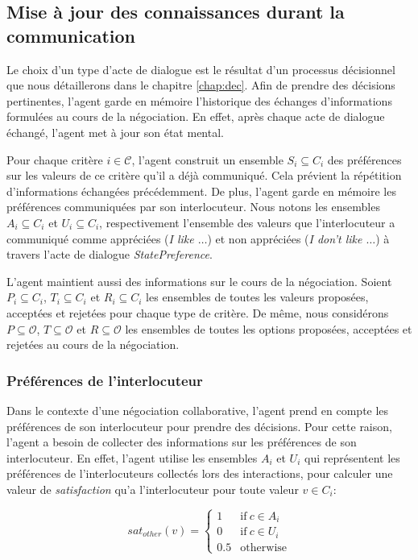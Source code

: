 			\subsection{Mise à jour des connaissances durant la communication}
			
			Le choix d'un type d'acte de dialogue est le résultat d'un processus décisionnel que nous détaillerons dans le chapitre \ref{chap:dec}. 
			Afin de prendre des décisions pertinentes, l'agent garde en mémoire l'historique des échanges d'informations formulées au cours de la négociation.  En effet, après chaque acte de dialogue échangé, l'agent met à jour son état mental.  
			
			
			Pour chaque critère $i\in\mathcal{C}$, l'agent construit un ensemble $S_i \subseteq C_i$ des préférences sur les valeurs de ce critère qu'il a déjà communiqué. Cela prévient la répétition d'informations échangées précédemment. 
			De plus, l'agent garde en mémoire les préférences communiquées par son interlocuteur. Nous notons les ensembles $A_i\subseteq C_i$ et $U_i\subseteq C_i$, respectivement l'ensemble des valeurs que l'interlocuteur a communiqué comme appréciées (\textit{I like $\ldots$}) et non appréciées  (\textit{I don't like $\ldots$}) à travers l'acte de dialogue \textit{StatePreference}. 
			
			L'agent maintient aussi des informations sur le cours de la négociation. Soient $P_i \subseteq C_i$, $T_i\subseteq C_i$ et $R_i\subseteq C_i$ les ensembles de toutes les valeurs proposées, acceptées et rejetées pour chaque type de critère. 
			De même, nous considérons $P\subseteq \mathcal{O}$, $T\subseteq \mathcal{O}$ et $R\subseteq \mathcal{O}$ les ensembles de toutes les options proposées, acceptées et rejetées au cours de la négociation.
			
			\subsubsection{Préférences de  l'interlocuteur}
				Dans le contexte d'une négociation collaborative, l'agent prend en compte les préférences de son interlocuteur pour prendre des décisions. Pour cette raison, l'agent a besoin de collecter des informations sur les préférences de son interlocuteur. En effet, l'agent utilise les ensembles $A_i$ et $U_i$ qui représentent les préférences de l'interlocuteurs collectés lors des interactions, pour calculer une valeur de \emph{satisfaction}  qu'a l'interlocuteur pour toute valeur $v\in C_i$: 
				
					\begin{equation}
					sat_{other}(v)= \left\{\begin{array}{ll}
					1	 & \mathrm{if\ }  c \in A_i\\
					0    & \mathrm{if\ }c \in U_i\\
					0.5	 & \mathrm{otherwise}
					\end{array}\right.
					\end{equation}
					
